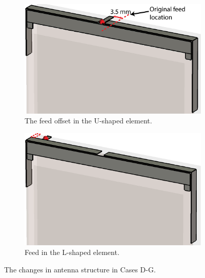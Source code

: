 \begin{figure}[H]
    \centering
    \begin{subfigure}[b]{0.49\textwidth}
        \includegraphics[width=\textwidth]{img/concept3_u_offset.eps}
        \caption{The feed offset in the U-shaped element.}
        \label{fig:concept3_u_offset}
    \end{subfigure}
    \begin{subfigure}[b]{0.49\textwidth}
        \includegraphics[width=\textwidth]{img/concept_l_feed.eps}
        \caption{Feed in the L-shaped element.}
        \label{fig:concept_l_feed}
    \end{subfigure}
    \caption{The changes in antenna structure in Cases D-G.}
    \label{fig:concept_offsets}
\end{figure}

